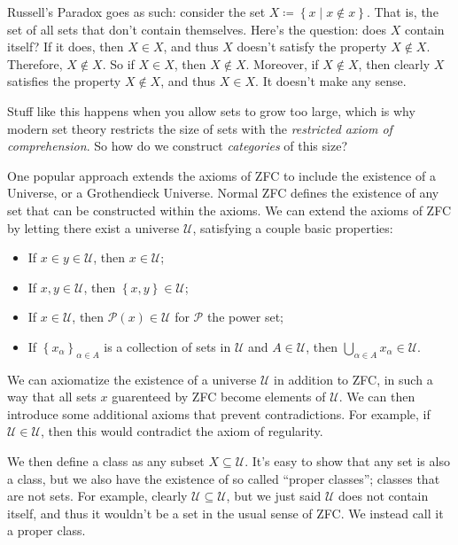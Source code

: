 \documentclass[11pt, letterpaper]{article}
\begin{document}
Russell's Paradox goes as such: consider the set $X\coloneqq \left\{ x\mid x\notin x \right\} $. That is, the set of all sets that don't contain themselves. Here's the question: does $X$ contain itself? If it does, then $X\in X$, and thus $X$ doesn't satisfy the property $X\notin X$. Therefore, $X\notin X$. So if $X\in X$, then $X\notin X$. Moreover, if $X\notin X$, then clearly $X$ satisfies the property $X\notin X$, and thus $X\in X$. It doesn't make any sense.

Stuff like this happens when you allow sets to grow too large, which is why modern set theory restricts the size of sets with the \emph{restricted axiom of comprehension}. So how do we construct \emph{categories} of this size?

One popular approach extends the axioms of ZFC to include the existence of a Universe, or a Grothendieck Universe. Normal ZFC defines the existence of any set that can be constructed within the axioms. We can extend the axioms of ZFC by letting there exist a universe $\mathcal{U} $, satisfying a couple basic properties:
\begin{itemize}
	\item If $x\in y\in \mathcal{U} $, then $x\in \mathcal{U} $;
	\item If $x,y\in \mathcal{U} $, then $\left\{ x,y \right\} \in \mathcal{U} $;
	\item If $x\in \mathcal{U} $, then $\mathscr{P} (x)\in \mathcal{U} $ for $\mathscr{P} $ the power set;
	\item If $\left\{ x_\alpha  \right\}_{\alpha \in A} $ is a collection of sets in $\mathcal{U} $ and $A\in \mathcal{U} $, then $\bigcup_{\alpha \in A} x_\alpha \in \mathcal{U} $.
\end{itemize}
We can axiomatize the existence of a universe $\mathcal{U} $ in addition to ZFC, in such a way that all sets $x$ guarenteed by ZFC become elements of $\mathcal{U} $. We can then introduce some additional axioms that prevent contradictions. For example, if $\mathcal{U} \in \mathcal{U} $, then this would contradict the axiom of regularity.

We then define a class as any subset $X\subseteq \mathcal{U} $. It's easy to show that any set is also a class, but we also have the existence of so called ``proper classes''; classes that are not sets. For example, clearly $\mathcal{U} \subseteq \mathcal{U} $, but we just said $\mathcal{U} $ does not contain itself, and thus it wouldn't be a set in the usual sense of ZFC. We instead call it a proper class.
\end{document}
